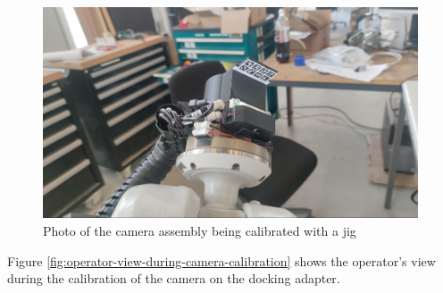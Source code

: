 \begin{figure}[!h]
    \centering
    \includegraphics[width=0.99\textwidth]{images/7a/img75.jpg}
    \caption{Photo of the camera assembly being calibrated with a jig}
    \label{fig:camera-assembly-being-calibrated-with-a-jig}
\end{figure}

Figure \ref{fig:operator-view-during-camera-calibration} shows the operator’s view during the calibration of the camera on the docking adapter.


